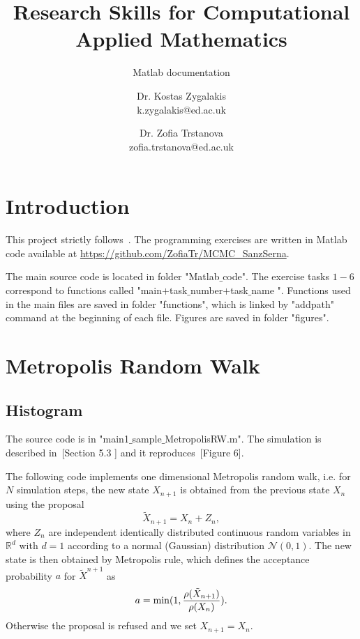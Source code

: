\documentclass{scrartcl}
\title{Research Skills for Computational Applied Mathematics}
\subtitle{Matlab documentation}
\newcommand{\R}{\mathbb{R}}
\begin{document}
\begin{titlepage}
\author{Dr. Kostas Zygalakis\\ k.zygalakis@ed.ac.uk
\and 
Dr. Zofia Trstanova\\zofia.trstanova@ed.ac.uk}


\clearpage\maketitle
\thispagestyle{empty}
\end{titlepage}

\newpage
\setcounter{page}{1}

\section{Introduction}
This project strictly follows~\cite{sanz2014markov}. The programming exercises are written in Matlab code available at \url{https://github.com/ZofiaTr/MCMC_SanzSerna}.

The main source code is located in folder "Matlab$\_$code". The exercise tasks $1-6$ correspond to functions called "main$+$task$\_$number$+$task$\_$name ". Functions used in the main files are saved in folder "functions", which is linked by "addpath" command at the beginning of each file. Figures are saved in folder "figures".

\section{Metropolis Random Walk}

\subsection{Histogram}
The source code is in "main1$\_$sample$\_$MetropolisRW.m". The simulation is described in~\cite{sanz2014markov}[Section 5.3 ] and it reproduces~\cite{sanz2014markov}[Figure 6].

The following code implements one dimensional Metropolis random walk, i.e. for $N$ simulation steps, the new state $X_{n+1}$ is obtained from the previous state $X_{n}$ using the proposal
\[
\tilde{X}_{n+1} = X_n + Z_n,
\]
where $Z_n$ are independent identically distributed continuous random variables in $\R^d$ with $d=1$ according to a normal (Gaussian) distribution $\mathcal{N}(0,1)$. The new state is then obtained by Metropolis rule, which defines the acceptance probability $a$ for $\tilde{X}^{n+1}$ as
\[
a  = {\rm min}(1, \frac{\rho(\tilde{X}_{n+1})}{\rho(X_n)}).
\]
Otherwise the proposal is refused and we set $X_{n+1}=X_{n}$. 
\end{document}
